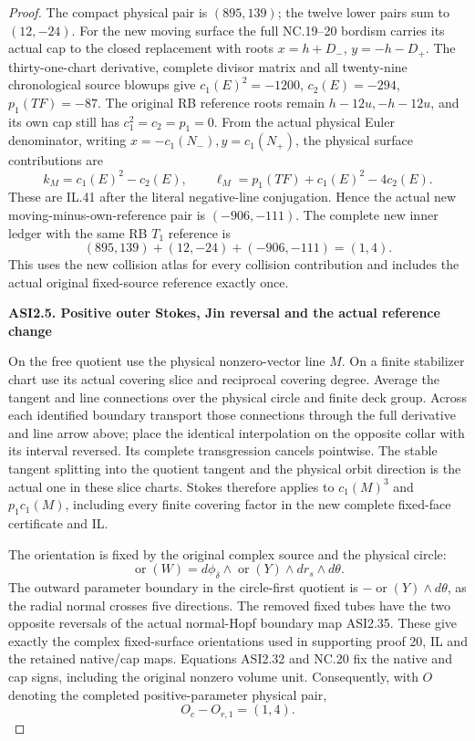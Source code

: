 \begin{proof}
The compact physical pair is \((895,139)\); the twelve lower
pairs sum to \((12,-24)\).  For the new moving surface the
full NC.19--20 bordism carries its actual cap to the closed
replacement with roots \(x=h+D_-\), \(y=-h-D_+\).
The thirty-one-chart derivative, complete divisor matrix and all
twenty-nine chronological source blowups give
\(c_1(E)^2=-1200\), \(c_2(E)=-294\), \(p_1(TF)=-87\).
The original RB reference roots remain \(h-12u,-h-12u\),
and its own cap still has \(c_1^2=c_2=p_1=0\).
From the actual physical Euler denominator,
writing \(x=-c_1(N_-),y=c_1(N_+)\), the
physical surface contributions are
\[
 k_M=c_1(E)^2-c_2(E),\qquad
 \ell_M=p_1(TF)+c_1(E)^2-4c_2(E).
 \tag{ASI2.41}
\]
These are IL.41 after the literal negative-line
conjugation. Hence the actual new moving-minus-own-reference pair is
\((-906,-111)\).  The complete new inner ledger with the same
RB \(T_1\) reference is
\[
 (895,139)+(12,-24)+(-906,-111)=(1,4).
\]
This uses the new collision atlas for every collision contribution
and includes the actual original fixed-source reference exactly once.

\par

\medskip\noindent\textbf{ASI2.5. Positive outer Stokes, Jin reversal and the actual reference change}

\par\nobreak

On the free quotient use the physical nonzero-vector
line \(M\). On a finite stabilizer chart use its
actual covering slice and reciprocal covering degree.
Average the tangent and line connections over the
physical circle and finite deck group. Across each
identified boundary transport those connections
through the full derivative and line arrow above;
place the identical interpolation on the opposite
collar with its interval reversed. Its complete
transgression cancels pointwise. The stable tangent
splitting into the quotient tangent and the
physical orbit direction is the actual one in
these slice charts. Stokes therefore applies to
\(c_1(M)^3\) and \(p_1c_1(M)\), including every
finite covering factor in the new complete fixed-face certificate and IL.

The orientation is fixed by the original complex
source and the physical circle:
\[
 \operatorname{or}(W)=d\phi_\delta\wedge
           \operatorname{or}(Y)\wedge dr_s\wedge d\theta.
 \tag{ASI2.43}
\]
The outward parameter boundary in the circle-first
quotient is \(-\operatorname{or}(Y)\wedge d\theta\),
as the radial normal crosses five directions.
The removed fixed tubes have the two opposite
reversals of the actual normal-Hopf boundary map
ASI2.35. These give exactly the complex
fixed-surface orientations used in supporting proof 20, IL and
the retained native/cap maps. Equations ASI2.32 and NC.20 fix the native
and cap signs, including the original nonzero
volume unit. Consequently, with \(O\) denoting
the completed positive-parameter physical pair,
\[
                 O_c-O_{r,1}=(1,4).
 \tag{ASI2.44}
\]


\end{proof}
